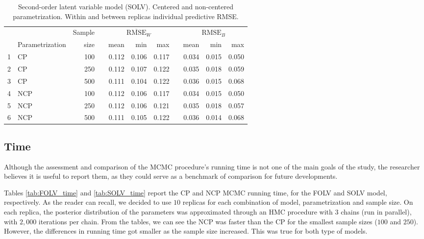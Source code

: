 %
\begin{table}[H]
	\centering
	\begin{tabular}{rlrrrrrrrrr}
		\hline
		&  & Sample && \multicolumn{3}{c}{ $\overline{\text{RMSE}}_{W}$ } && \multicolumn{3}{c}{ $\text{RMSE}_{B}$ } \\
		\cmidrule(rl){5-7} \cmidrule(rl){9-11}  
		& Parametrization & size  && mean & min & max && mean & min & max \\ 
		\hline\hline
		1 & CP & 100 && 0.112 & 0.106 & 0.117 && 0.034 & 0.015 & 0.050 \\ 
		2 & CP & 250 && 0.112 & 0.107 & 0.122 && 0.035 & 0.018 & 0.059 \\ 
		3 & CP & 500 && 0.111 & 0.104 & 0.122 && 0.036 & 0.015 & 0.068 \\ 
		\hline
		4 & NCP & 100 && 0.112 & 0.106 & 0.117 && 0.034 & 0.015 & 0.050 \\
		5 & NCP & 250 && 0.112 & 0.106 & 0.121 && 0.035 & 0.018 & 0.057 \\
		6 & NCP & 500 && 0.111 & 0.105 & 0.122 && 0.036 & 0.014 & 0.068 \\ 
		\hline
	\end{tabular}
	\caption[Second-order latent variable model (SOLV). Centered and non-centered parametrization. Within and between replicas individual predictive RMSE.]%
	{Second-order latent variable model (SOLV). Centered and non-centered parametrization. Within and between replicas individual predictive RMSE.}
	\label{tab:SOLV_accuracy}
\end{table}


\subsection{Time}

Although the assessment and comparison of the MCMC procedure's running time is not one of the main goals of the study, the researcher believes it is useful to report them, as they could serve as a benchmark of comparison for future developments.

Tables \ref{tab:FOLV_time} and \ref{tab:SOLV_time} report the CP and NCP MCMC running time, for the FOLV and SOLV model, respectively. As the reader can recall, we decided to use $10$ replicas for each combination of model, parametrization and sample size. On each replica, the posterior distribution of the parameters was approximated through an HMC procedure with $3$ chains (run in parallel), with $2,000$ iterations per chain. From the tables, we can see the NCP was faster than the CP for the smallest sample sizes ($100$ and $250$).  However, the differences in running time got smaller as the sample size increased. This was true for both type of models. 

